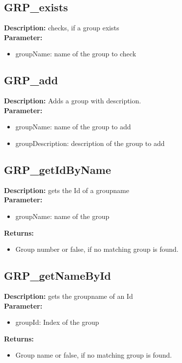 \subsection{GRP\_exists}
\textbf{Description:} checks, if a group exists\\
\textbf{Parameter:}
\begin{itemize}
\item groupName: name of the group to check
\end{itemize}

\subsection{GRP\_add}
\textbf{Description:} Adds a group with description.\\
\textbf{Parameter:}
\begin{itemize}
\item groupName: name of the group to add
\item groupDescription: description of the group to add
\end{itemize}

\subsection{GRP\_getIdByName}
\textbf{Description:} gets the Id of a groupname\\
\textbf{Parameter:}
\begin{itemize}
\item groupName: name of the group
\end{itemize}
\textbf{Returns:}
\begin{itemize}
\item Group number or false, if no matching group is found.
\end{itemize}

\subsection{GRP\_getNameById}
\textbf{Description:} gets the groupname of an Id\\
\textbf{Parameter:}
\begin{itemize}
\item groupId: Index of the group
\end{itemize}
\textbf{Returns:}
\begin{itemize}
\item Group name or false, if no matching group is found.
\end{itemize}

